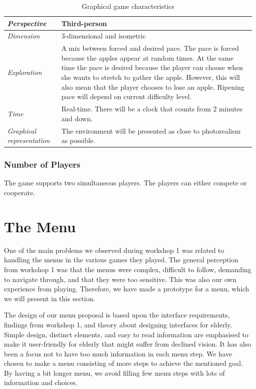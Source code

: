 \begin{table} [H]
\centering
    \begin{tabular}{|p{}|p{}|}
       \hline
      \emph {Perspective} & Third-person \\ \hline
       \emph{Dimension} &  3-dimensional and isometric \\ \hline
	       \emph{Exploration} &  A mix between forced and desired pace. The pace is forced because the apples appear at random times. At the same time the pace is desired because the player can choose when she wants to stretch to gather the apple. However, this will also mean that the player chooses to lose an apple. Ripening pace will depend on current difficulty level.\\ \hline
	       \emph{Time} & Real-time. There will be a clock that counts from 2 minutes and down. \\ \hline
	       \emph{Graphical representation} & The environment will be presented as close to photorealism as possible.  \\ \hline
    \end{tabular}
    \caption[Graphical game characteristics in the "Apple Picking" game]{Graphical game characteristics}
    \label{tab:graphical2}
\end{table}  

\subsubsection{Number of Players} 
The game supports two simultaneous players. The players can either compete or cooperate. 


\section{The Menu}
\label{sec:menu}

One of the main problems we observed during workshop 1 was related to handling the menus in the various games they played. The general perception from workshop 1 was that the menus were complex, difficult to follow, demanding to navigate through, and that they were too sensitive. This was also our own experience from playing. Therefore, we have made a prototype for a menu, which we will present in this section.

The design of our menu proposal is based upon the interface requirements, findings from workshop 1, and theory about designing interfaces for elderly. Simple design, distinct elements, and easy to read information are emphasised to make it user-friendly for elderly that might suffer from declined vision. It has also been a focus not to have too much information in each menu step. We have chosen to make a menu consisting of more steps to achieve the mentioned goal. By having a bit longer menu, we avoid filling few menu steps with lots of information and choices.    

